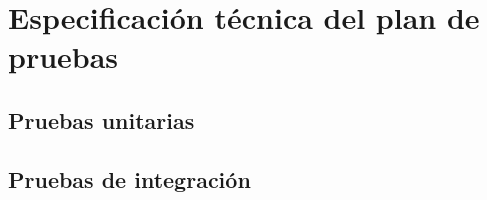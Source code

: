 \chapter{Especificación técnica del plan de pruebas}
\label{ch:especificacion_tecnica_plan_pruebas}

\section{Pruebas unitarias}



\newpage

\section{Pruebas de integración}



